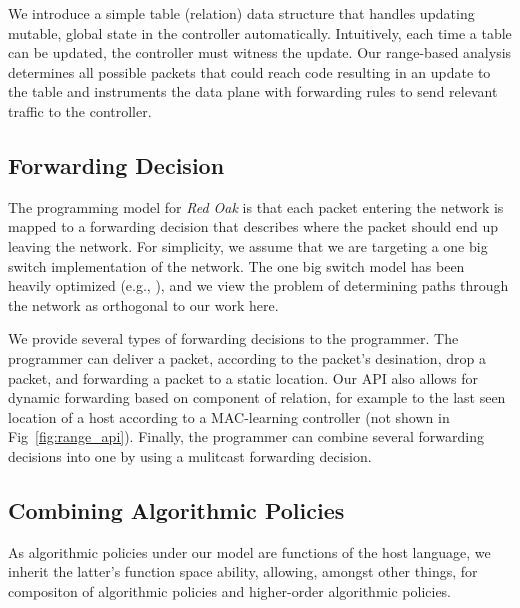 \documentclass[preprint]{sigplanconf}
\begin{document}
	We introduce a simple table (relation) data structure that handles updating mutable, global state in the controller automatically. Intuitively, each time a table can be updated, the controller must witness the update. Our range-based analysis determines all possible packets that could reach code resulting in an update to the table and instruments the data plane with forwarding rules to send relevant traffic to the controller.

   

     
  

   \subsection*{Forwarding Decision}
	The programming model for \textit{Red Oak} is that each packet entering the network is mapped to a forwarding decision that describes where the packet should end up leaving the network. For simplicity, we assume that we are targeting a one big switch implementation of the network. The one big switch model has been heavily optimized (e.g., \cite{Obs}), and we view the problem of determining paths through the network as orthogonal to our work here. 
  
   We provide several types of forwarding decisions to the programmer. The programmer can deliver a packet, according to the packet's desination, drop a packet, and forwarding a packet to a static location. Our API also allows for dynamic forwarding based on component of relation, for example to the last seen location of a host according to a MAC-learning controller (not shown in Fig~\ref{fig:range_api}). Finally, the programmer can combine several forwarding decisions into one by using a mulitcast forwarding decision.
   

   \subsection*{Combining Algorithmic Policies}
   As algorithmic policies under our model are functions of the host language, we inherit the latter's function space ability, allowing, amongst other things, for compositon of algorithmic policies and higher-order algorithmic policies.
\end{document}
